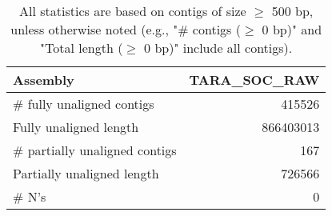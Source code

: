 \documentclass[12pt,a4paper]{article}
\begin{document}
\begin{table}[ht]
\begin{center}
\caption{All statistics are based on contigs of size $\geq$ 500 bp, unless otherwise noted (e.g., "\# contigs ($\geq$ 0 bp)" and "Total length ($\geq$ 0 bp)" include all contigs).}
\begin{tabular}{|l*{1}{|r}|}
\hline
Assembly & TARA\_SOC\_RAW \\ \hline
\# fully unaligned contigs & 415526 \\ \hline
Fully unaligned length & 866403013 \\ \hline
\# partially unaligned contigs & 167 \\ \hline
Partially unaligned length & 726566 \\ \hline
\# N's & 0 \\ \hline
\end{tabular}
\end{center}
\end{table}
\end{document}
